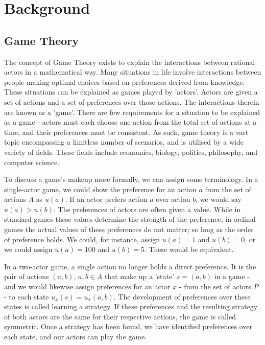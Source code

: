 \chapter{Background}\label{C:bg}

\section{Game Theory}\label{sec:GTintro}

The concept of Game Theory exists to explain the interactions between rational actors in a mathematical way. Many situations in life involve interactions between people making optimal choices based on preferences derived from knowledge. These situations can be explained as games played by 'actors'. Actors are given a set of actions and a set of preferences over those actions. The interactions therein are known as a 'game'. There are few requirements for a situation to be explained as a game - actors must each choose one action from the total set of actions at a time, and their preferences must be consistent. \cite{fudenberg1991game, osborne2004introduction, owen2013game} As such, game theory is a vast topic encompassing a limitless number of scenarios, and is utilised by a wide variety of fields. These fields include economics, biology, politics, philosophy, and computer science.

To discuss a game's makeup more formally, we can assign some terminology. In a single-actor game, we could show the preference for an action $a$ from the set of actions $A$ as $u(a)$. If an actor prefers action $a$ over action $b$, we would say $u(a) > u(b)$. The preferences of actors are often given a value. While in standard games these values determine the strength of the preference, in ordinal games the actual values of these preferences do not matter; so long as the order of preference holds. We could, for instance, assign $u(a) = 1$ and $u(b) = 0$, or we could assign $u(a) = 100$ and $u(b) = 5$. These would be equivalent. \cite{osborne2004introduction}

In a two-actor game, a single action no longer holds a direct preference. It is the pair of actions $(a,b)$, $a,b \in A$ that make up a 'state' $s = (a,b)$ in a game - and we would likewise assign preferences for an actor $x$ - from the set of actors $P$ - to each state $u_x(s) = u_x(a,b)$. The development of preferences over these states is called learning a strategy. If these preferences and the resulting strategy of both actors are the same for their respective actions, the game is called symmetric. Once a strategy has been found, we have identified preferences over each state, and our actors can play the game.

